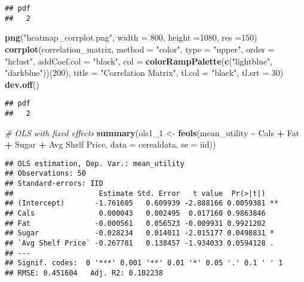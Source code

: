 \documentclass[
]{article}
\newenvironment{Shaded}{\begin{snugshade}}{\end{snugshade}}
\newcommand{\AttributeTok}[1]{\textcolor[rgb]{0.13,0.29,0.53}{#1}}
\newcommand{\CommentTok}[1]{\textcolor[rgb]{0.56,0.35,0.01}{\textit{#1}}}
\newcommand{\DecValTok}[1]{\textcolor[rgb]{0.00,0.00,0.81}{#1}}
\newcommand{\FunctionTok}[1]{\textcolor[rgb]{0.13,0.29,0.53}{\textbf{#1}}}
\newcommand{\NormalTok}[1]{#1}
\newcommand{\OtherTok}[1]{\textcolor[rgb]{0.56,0.35,0.01}{#1}}
\newcommand{\SpecialCharTok}[1]{\textcolor[rgb]{0.81,0.36,0.00}{\textbf{#1}}}
\newcommand{\StringTok}[1]{\textcolor[rgb]{0.31,0.60,0.02}{#1}}
\begin{document}
\begin{verbatim}
## pdf 
##   2
\end{verbatim}

\begin{Shaded}
\begin{Highlighting}[]
\FunctionTok{png}\NormalTok{(}\StringTok{"heatmap\_corrplot.png"}\NormalTok{, }\AttributeTok{width =} \DecValTok{800}\NormalTok{, }\AttributeTok{height =}\DecValTok{1080}\NormalTok{, }\AttributeTok{res =}\DecValTok{150}\NormalTok{)}
\FunctionTok{corrplot}\NormalTok{(correlation\_matrix, }\AttributeTok{method =} \StringTok{"color"}\NormalTok{,}
         \AttributeTok{type =} \StringTok{"upper"}\NormalTok{, }
         \AttributeTok{order =} \StringTok{"hclust"}\NormalTok{, }
         \AttributeTok{addCoef.col =} \StringTok{"black"}\NormalTok{, }
         \AttributeTok{col =} \FunctionTok{colorRampPalette}\NormalTok{(}\FunctionTok{c}\NormalTok{(}\StringTok{"lightblue"}\NormalTok{, }\StringTok{"darkblue"}\NormalTok{))(}\DecValTok{200}\NormalTok{), }
         \AttributeTok{title =} \StringTok{"Correlation Matrix"}\NormalTok{, }
         \AttributeTok{tl.col =} \StringTok{"black"}\NormalTok{, }\AttributeTok{tl.srt =} \DecValTok{30}\NormalTok{) }
\FunctionTok{dev.off}\NormalTok{()}
\end{Highlighting}
\end{Shaded}

\begin{verbatim}
## pdf 
##   2
\end{verbatim}

\begin{Shaded}
\begin{Highlighting}[]
\CommentTok{\#  OLS with fixed effects}
\FunctionTok{summary}\NormalTok{(ols1\_1 }\OtherTok{\textless{}{-}} \FunctionTok{feols}\NormalTok{(mean\_utility }\SpecialCharTok{\textasciitilde{}}\NormalTok{ Cals }\SpecialCharTok{+}\NormalTok{ Fat }\SpecialCharTok{+}\NormalTok{ Sugar }\SpecialCharTok{+} \StringTok{\textasciigrave{}}\AttributeTok{Avg Shelf Price}\StringTok{\textasciigrave{}}\NormalTok{, }\AttributeTok{data =}\NormalTok{ cerealdata, }\AttributeTok{se =} \StringTok{\textquotesingle{}iid\textquotesingle{}}\NormalTok{))}
\end{Highlighting}
\end{Shaded}

\begin{verbatim}
## OLS estimation, Dep. Var.: mean_utility
## Observations: 50
## Standard-errors: IID 
##                    Estimate Std. Error   t value  Pr(>|t|)    
## (Intercept)       -1.761605   0.609939 -2.888166 0.0059381 ** 
## Cals               0.000043   0.002495  0.017160 0.9863846    
## Fat               -0.000561   0.056523 -0.009931 0.9921202    
## Sugar             -0.028234   0.014011 -2.015177 0.0498831 *  
## `Avg Shelf Price` -0.267781   0.138457 -1.934033 0.0594128 .  
## ---
## Signif. codes:  0 '***' 0.001 '**' 0.01 '*' 0.05 '.' 0.1 ' ' 1
## RMSE: 0.451604   Adj. R2: 0.102238
\end{verbatim}
\end{document}
